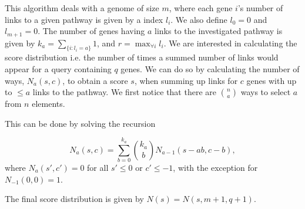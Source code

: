 \documentclass[11pt]{article}
\begin{document}
This algorithm deals with a genome of size $m$, where each gene $i$'s number of links to a given pathway is given by a index $l_i$. We also define $l_0=0$ and $l_{m+1}=0$. The number of genes having $a$ links to the investigated pathway is given by $k_a=\sum_{\{i:l_i=a\}}1$, and $r=\max_{\forall i}{l_i}$.
We are interested in calculating the score distribution i.e. the number of times a summed number of links would appear for a query containing $q$ genes.
We can do so by calculating the number of ways, $N_a(s,c)$, to obtain a score $s$, when summing up links for $c$ genes with up to $\le a$ links to the pathway.
We first notice that there are $n\choose a$ ways to select $a$ from $n$ elements.

This can be done by solving the recursion

\[
N_a(s,c)=\sum_{b=0}^{k_a}{k_a \choose b} N_{a-1}(s-ab,c-b),
\]
where $N_a(s',c')=0$ for all $s'\le 0$ or $c' \le -1$, with the exception for $N_{-1}(0,0)=1$.

The final score distribution is given by $N(s)=N(s,m+1,q+1)$.
\end{document}
